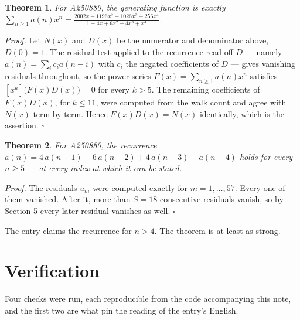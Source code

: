 \documentclass[11pt]{article}
\newtheorem{theorem}{Theorem}
\theoremstyle{definition}
\begin{document}
\begin{theorem} For A250880, the generating function is exactly $\sum_{n\ge 1} a(n)x^n = \frac{2002x - 1196x^{2} + 1026x^{3} - 256x^{4}}{1 - 4x + 6x^{2} - 4x^{3} + x^{4}}$.\end{theorem}

{\itshape Proof.} Let $N(x)$ and $D(x)$ be the numerator and denominator above, $D(0)=1$. The residual test applied to the recurrence read off $D$ --- namely $a(n) = \sum_i c_i a(n-i)$ with $c_i$ the negated coefficients of $D$ --- gives vanishing residuals throughout, so the power series $F(x)=\sum_{n\ge 1}a(n)x^n$ satisfies $[x^k]\bigl(F(x)D(x)\bigr) = 0$ for every $k > 5$. The remaining coefficients of $F(x)D(x)$, for $k \le 11$, were computed from the walk count and agree with $N(x)$ term by term. Hence $F(x)D(x) = N(x)$ identically, which is the assertion. $\square$

\begin{theorem} For A250880, the recurrence $a(n) = 4\,a(n-1) - 6\,a(n-2) + 4\,a(n-3) - a(n-4)$ holds for every $n \ge 5$ --- at every index at which it can be stated.\end{theorem}

{\itshape Proof.} The residuals $u_m$ were computed exactly for $m = 1,\dots,57$. Every one of them vanished. After it, more than $S = 18$ consecutive residuals vanish, so by Section 5 every later residual vanishes as well. $\square$

The entry claims the recurrence for $n > 4$. The theorem is at least as strong.

\section{Verification}

Four checks were run, each reproducible from the code accompanying this note, and the first two are what pin the reading of the entry's English.
\end{document}
